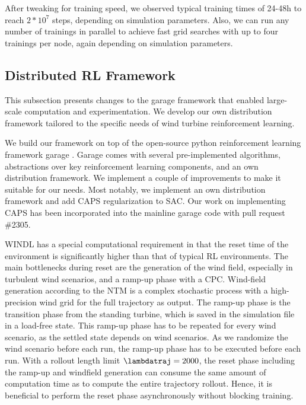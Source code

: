 After tweaking for training speed, we observed typical training times of 24-48h to reach $2*10^7$ steps, depending on simulation parameters. Also, we can run any number of trainings in parallel to achieve fast grid searches with up to four trainings per node, again depending on simulation parameters.

\subsection{Distributed RL Framework}
\label{section:approach-distributed}

\begin{summary}
This subsection presents changes to the garage framework that enabled large-scale computation and experimentation. We develop our own distribution framework tailored to the specific needs of wind turbine reinforcement learning.
\end{summary}

We build our framework on top of the open-source python reinforcement learning framework garage \cite{contributorsGarageToolkitReproducible2019}. Garage comes with several pre-implemented algorithms, abstractions over key reinforcement learning components, and an own distribution framework. We implement a couple of improvements to make it suitable for our needs. Most notably, we implement an own distribution framework and add CAPS regularization \cite{mysoreRegularizingActionPolicies2021} to \ac{SAC}. Our work on implementing CAPS has been incorporated into the mainline garage code with pull request \#2305.

\ac{WINDL} has a special computational requirement in that the reset time of the environment is significantly higher than that of typical RL environments. The main bottlenecks during reset are the generation of the wind field, especially in turbulent wind scenarios, and a ramp-up phase with a \ac{CPC}. Wind-field generation according to the \ac{NTM} is a complex stochastic process with a high-precision wind grid for the full trajectory as output. The ramp-up phase is the transition phase from the standing turbine, which is saved in the simulation file in a load-free state. This ramp-up phase has to be repeated for every wind scenario, as the settled state depends on wind scenarios. As we randomize the wind scenario before each run, the ramp-up phase has to be executed before each run. With a rollout length limit $\lambdatraj = 2000$, the reset phase including the ramp-up and windfield generation can consume the same amount of computation time as to compute the entire trajectory rollout. Hence, it is beneficial to perform the reset phase asynchronously without blocking training.

